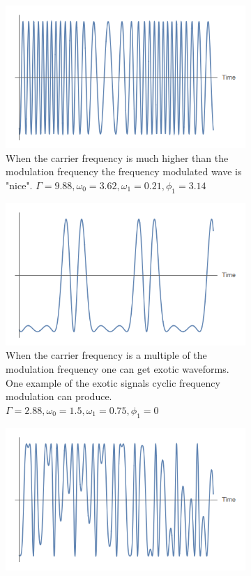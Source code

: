 \documentclass[onecolumn, groupedaddress, 10pt]{revtex4-1}
\begin{document}
\begin{figure}[H]
	\centering
	\begin{subfigure}{.5\textwidth}
  		\centering
  		\includegraphics[width=.9\linewidth]{classicSignal.png}
  		\caption{When the carrier frequency is much higher than the modulation frequency the frequency modulated wave is "nice". $\Gamma = 9.88, \omega_0 = 3.62, \omega_1 = 0.21, \phi_1 = 3.14$ \label{fig:niceSignal}}
	\end{subfigure}%
	\begin{subfigure}{.5\textwidth}
  		\centering
  		\includegraphics[width=.9\linewidth]{interestingSignal.png}
  		\caption{When the carrier frequency is a multiple of the modulation frequency one can get exotic waveforms.  One example of the exotic signals cyclic frequency modulation can produce.  $\Gamma = 2.88, \omega_0 = 1.5, \omega_1 = 0.75, \phi_1 = 0$ \label{fig:interestingSignal}}
	\end{subfigure}
	\begin{subfigure}{.5\textwidth}
  		\centering
  		\includegraphics[width=.9\linewidth]{nastySignal.png}

\end{subfigure}
\end{figure}
\end{document}
